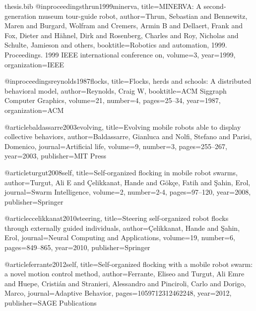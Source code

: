 \documentclass[oneside, a4paper, 12pt]{memoir}
\begin{document}
\begin{filecontents}{thesis.bib}
@inproceedings{thrun1999minerva,
  title={MINERVA: A second-generation museum tour-guide robot},
  author={Thrun, Sebastian and Bennewitz, Maren and Burgard, Wolfram and Cremers, Armin B and Dellaert, Frank and Fox, Dieter and H{\"a}hnel, Dirk and Rosenberg, Charles and Roy, Nicholas and Schulte, Jamieson and others},
  booktitle={Robotics and automation, 1999. Proceedings. 1999 IEEE international conference on},
  volume={3},
  year={1999},
  organization={IEEE}
}

@inproceedings{reynolds1987flocks,
  title={Flocks, herds and schools: A distributed behavioral model},
  author={Reynolds, Craig W},
  booktitle={ACM Siggraph Computer Graphics},
  volume={21},
  number={4},
  pages={25--34},
  year={1987},
  organization={ACM}
}

@article{baldassarre2003evolving,
  title={Evolving mobile robots able to display collective behaviors},
  author={Baldassarre, Gianluca and Nolfi, Stefano and Parisi, Domenico},
  journal={Artificial life},
  volume={9},
  number={3},
  pages={255--267},
  year={2003},
  publisher={MIT Press}
}

@article{turgut2008self,
  title={Self-organized flocking in mobile robot swarms},
  author={Turgut, Ali E and {\c{C}}elikkanat, Hande and G{\"o}k{\c{c}}e, Fatih and {\c{S}}ahin, Erol},
  journal={Swarm Intelligence},
  volume={2},
  number={2-4},
  pages={97--120},
  year={2008},
  publisher={Springer}
}

@article{ccelikkanat2010steering,
  title={Steering self-organized robot flocks through externally guided individuals},
  author={{\c{C}}elikkanat, Hande and {\c{S}}ahin, Erol},
  journal={Neural Computing and Applications},
  volume={19},
  number={6},
  pages={849--865},
  year={2010},
  publisher={Springer}
}

@article{ferrante2012self,
  title={Self-organized flocking with a mobile robot swarm: a novel motion control method},
  author={Ferrante, Eliseo and Turgut, Ali Emre and Huepe, Cristi{\'a}n and Stranieri, Alessandro and Pinciroli, Carlo and Dorigo, Marco},
  journal={Adaptive Behavior},
  pages={1059712312462248},
  year={2012},
  publisher={SAGE Publications}
}

\end{filecontents}



\end{document}
